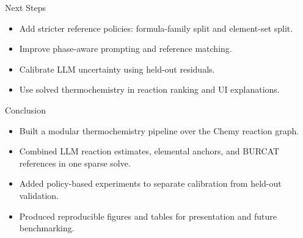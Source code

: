 \documentclass[aspectratio=169,10pt]{beamer}
\begin{document}
\begin{frame}{Next Steps}
  \begin{itemize}
    \item Add stricter reference policies: formula-family split and element-set split.
    \item Improve phase-aware prompting and reference matching.
    \item Calibrate LLM uncertainty using held-out residuals.
    \item Use solved thermochemistry in reaction ranking and UI explanations.
  \end{itemize}
\end{frame}

\begin{frame}{Conclusion}
  \begin{itemize}
    \item Built a modular thermochemistry pipeline over the Chemy reaction graph.
    \item Combined LLM reaction estimates, elemental anchors, and BURCAT references in one sparse solve.
    \item Added policy-based experiments to separate calibration from held-out validation.
    \item Produced reproducible figures and tables for presentation and future benchmarking.
  \end{itemize}
\end{frame}
\end{document}
